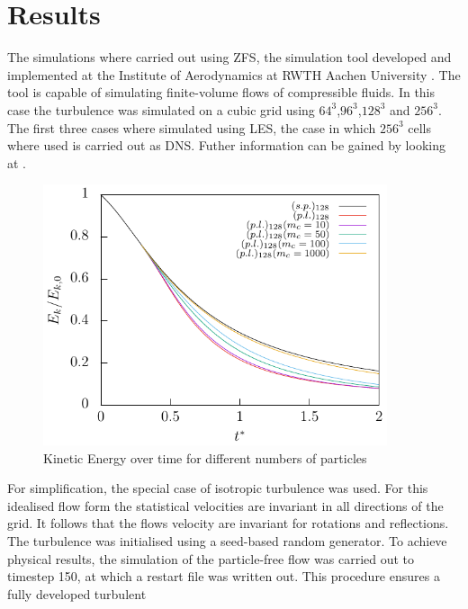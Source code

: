 \documentclass[a4paper,12pt]{article}
\numberwithin{equation}{section} %
\begin{document}
\section{Results}
The simulations where carried out using ZFS, the simulation tool developed and implemented at the Institute of Aerodynamics at RWTH Aachen University 
\cite{anAdaptiveMultilevelMultigridFormulationForCartesianHierarchicalGridMethods} \cite{aStrictlyConservativeCartesianCutCellMethodForCompressibleViscousFlowsOnAdaptiveGrids}. 
The tool is capable of simulating finite-volume flows of compressible fluids. 
In this case the turbulence was simulated on a cubic grid using $64^3$,$96^3$,$128^3$ and $256^3$. The first three cases where simulated using LES, 
the case in which $256^3$ cells where used is carried out as DNS. Futher information can be gained by looking at \cite[p.344-357 for DNS and p. 558-639 for LES]{turbulentFlows}.
\begin{figure}[h]
	\centering
  \includegraphics[width=0.9\textwidth]{./../Simulationsergebnisse/variationWolken/128/kineticEnergy_time.pdf}
	\caption{Kinetic Energy over time for different numbers of particles}
	\label{kineticEnergy_time_128}
\end{figure}
\newline
For simplification, the special case of isotropic turbulence was used. For this idealised flow form the statistical 
velocities are invariant in all directions of the grid. It follows that the flows velocity are invariant for rotations and reflections. 
The turbulence was initialised using a seed-based random generator. To achieve physical results, the simulation of the particle-free flow was carried out  to timestep 150, 
at which a restart file was written out. This procedure ensures a fully developed turbulent 
\end{document}
